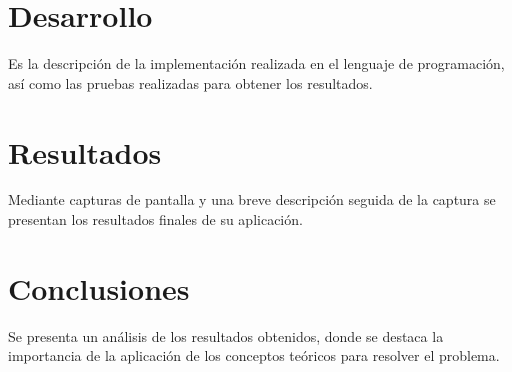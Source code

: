 \documentclass[letterpaper,12pt,oneside]{article}
\begin{document}
\section{Desarrollo}

Es la descripción de la implementación realizada en el lenguaje de programación, así como las pruebas realizadas para obtener los resultados.

\section{Resultados}

Mediante capturas de pantalla y una breve descripción seguida de la captura se presentan los resultados finales de su aplicación.

\section{Conclusiones}

Se presenta un análisis de los resultados obtenidos, donde se destaca la importancia de la aplicación de los conceptos teóricos para resolver el problema.

\printbibliography
\end{document}
